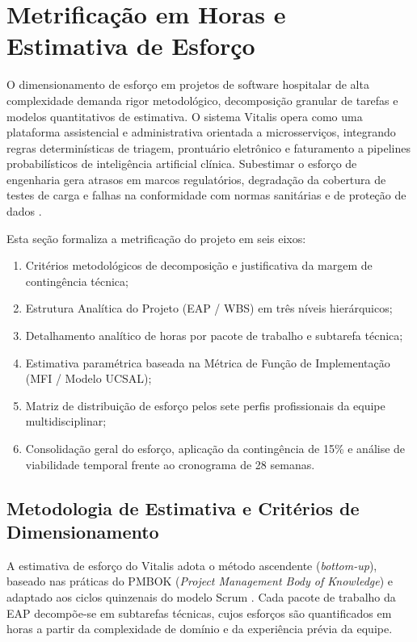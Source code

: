 \section{Metrificação em Horas e Estimativa de Esforço}

O dimensionamento de esforço em projetos de software hospitalar de alta complexidade demanda rigor metodológico, decomposição granular de tarefas e modelos quantitativos de estimativa. O sistema Vitalis opera como uma plataforma assistencial e administrativa orientada a microsserviços, integrando regras determinísticas de triagem, prontuário eletrônico e faturamento a pipelines probabilísticos de inteligência artificial clínica. Subestimar o esforço de engenharia gera atrasos em marcos regulatórios, degradação da cobertura de testes de carga e falhas na conformidade com normas sanitárias e de proteção de dados \cite{pressman:2016, sommerville:2019}.

Esta seção formaliza a metrificação do projeto em seis eixos:
\begin{enumerate}[leftmargin=*]
    \item Critérios metodológicos de decomposição e justificativa da margem de contingência técnica;
    \item Estrutura Analítica do Projeto (EAP / WBS) em três níveis hierárquicos;
    \item Detalhamento analítico de horas por pacote de trabalho e subtarefa técnica;
    \item Estimativa paramétrica baseada na Métrica de Função de Implementação (MFI / Modelo UCSAL);
    \item Matriz de distribuição de esforço pelos sete perfis profissionais da equipe multidisciplinar;
    \item Consolidação geral do esforço, aplicação da contingência de 15\% e análise de viabilidade temporal frente ao cronograma de 28 semanas.
\end{enumerate}

\subsection{Metodologia de Estimativa e Critérios de Dimensionamento}

A estimativa de esforço do Vitalis adota o método ascendente (\textit{bottom-up}), baseado nas práticas do PMBOK (\textit{Project Management Body of Knowledge}) e adaptado aos ciclos quinzenais do modelo Scrum \cite{pressman:2016}. Cada pacote de trabalho da EAP decompõe-se em subtarefas técnicas, cujos esforços são quantificados em horas a partir da complexidade de domínio e da experiência prévia da equipe.

